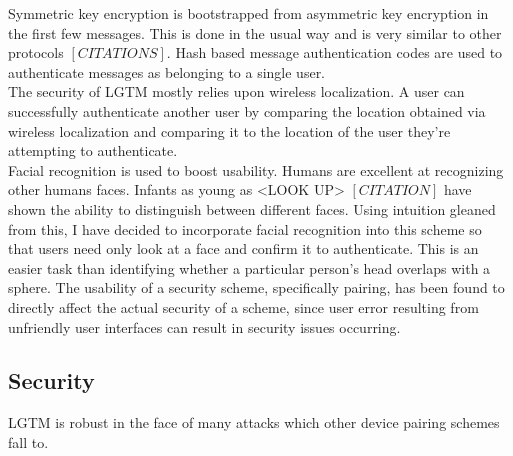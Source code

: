\documentclass[12pt]{report}
\begin{document}
Symmetric key encryption is bootstrapped from asymmetric key encryption in the first few messages. This is done in the usual way and is very similar to other protocols $[CITATIONS]$. Hash based message authentication codes are used to authenticate messages as belonging to a single user. \\

The security of LGTM mostly relies upon wireless localization. A user can successfully authenticate another user by comparing the location obtained via wireless localization and comparing it to the location of the user they're attempting to authenticate. \\

Facial recognition is used to boost usability. Humans are excellent at recognizing other humans faces. Infants as young as <LOOK UP> $[CITATION]$ have shown the ability to distinguish between different faces. Using intuition gleaned from this, I have decided to incorporate facial recognition into this scheme so that users need only look at a face and confirm it to authenticate. This is an easier task than identifying whether a particular person's head overlaps with a sphere. The usability of a security scheme, specifically pairing, has been found to directly affect the actual security of a scheme, since user error resulting from unfriendly user interfaces can result in security issues occurring.


\subsection{Security}
LGTM is robust in the face of many attacks which other device pairing schemes fall to. 
\end{document}

